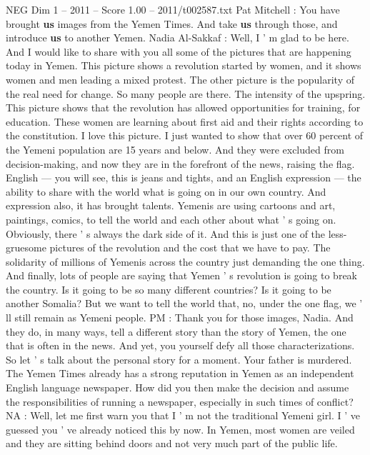 \begin{textsample}{NEG Dim 1 – 2011 – Score 1.00 – 2011/t002587.txt}  \label{ex:f1_neg_048}
Pat Mitchell : You have brought \textbf{us} images from the Yemen Times.
And take \textbf{us} through those, and introduce \textbf{us} to another Yemen.
Nadia Al-Sakkaf : Well, I ' m glad to be here.
And I would like to share with you all some of the pictures that are happening today in Yemen.
This picture shows a revolution started by women, and it shows women and men leading a mixed protest.
The other picture is the popularity of the real need for change.
So many people are there.
The intensity of the upspring.
This picture shows that the revolution has allowed opportunities for training, for education.
These women are learning about first aid and their rights according to the constitution.
I love this picture.
I just wanted to show that over 60 percent of the Yemeni population are 15 years and below.
And they were excluded from decision-making, and now they are in the forefront of the news, raising the flag.
English — you will see, this is jeans and tights, and an English expression — the ability to share with the world what is going on in our own country.
And expression also, it has brought talents.
Yemenis are using cartoons and art, paintings, comics, to tell the world and each other about what ' s going on.
Obviously, there ' s always the dark side of it.
And this is just one of the less-gruesome pictures of the revolution and the cost that we have to pay.
The solidarity of millions of Yemenis across the country just demanding the one thing.
And finally, lots of people are saying that Yemen ' s revolution is going to break the country.
Is it going to be so many different countries?
Is it going to be another Somalia?
But we want to tell the world that, no, under the one flag, we ' ll still remain as Yemeni people.
PM : Thank you for those images, Nadia.
And they do, in many ways, tell a different story than the story of Yemen, the one that is often in the news.
And yet, you yourself defy all those characterizations.
So let ' s talk about the personal story for a moment.
Your father is murdered.
The Yemen Times already has a strong reputation in Yemen as an independent English language newspaper.
How did you then make the decision and assume the responsibilities of running a newspaper, especially in such times of conflict?
NA : Well, let me first warn you that I ' m not the traditional Yemeni girl.
I ' ve guessed you ' ve already noticed this by now.
In Yemen, most women are veiled and they are sitting behind doors and not very much part of the public life.

\end{textsample}
